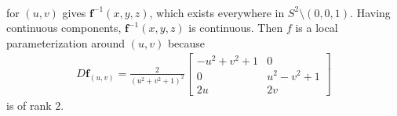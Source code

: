 \documentclass[a4paper,12pt]{article}
\newcommand{\bs}{\boldsymbol}
\theoremstyle{remark}
\begin{document}
\begin{enumerate}
\begin{enumerate}
\begin{align*}
                \end{align*}
                for $(u, v)$ gives $\bs{f}^{-1}(x, y, z)$, which %
                exists everywhere in $S^2 \setminus (0, 0, 1)$. %
                Having continuous components, $\bs{f}^{-1}(x, y, z)$ is continuous. Then $f$ is a local parameterization around $(u, v)$ because
                \begin{align*}
                    D\bs{f}_{(u, v)} = \frac{2}{(u^2 + v^2 + 1)^2} \left[ \begin{array}{cc}
                            -u^2 + v^2 + 1 & 0 \\
                            0 & u^2 - v^2 + 1 \\
                            2u & 2v
                    \end{array} \right]
                \end{align*}
                is of rank $2$.
        \end{enumerate}
\end{enumerate}
\end{document}
